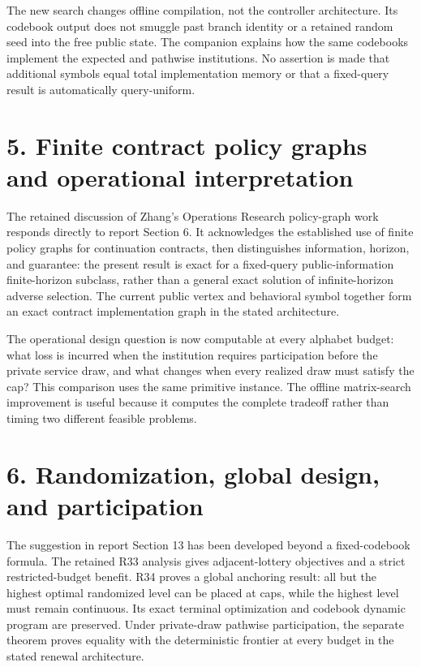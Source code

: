 \documentclass[11pt,letterpaper]{article}
\begin{document}
The new search changes offline compilation, not the controller architecture. Its codebook output does not smuggle past branch identity or a retained random seed into the free public state. The companion explains how the same codebooks implement the expected and pathwise institutions. No assertion is made that additional symbols equal total implementation memory or that a fixed-query result is automatically query-uniform.


\section*{5. Finite contract policy graphs and operational interpretation}

The retained discussion of Zhang's Operations Research policy-graph work responds directly to report Section 6. It acknowledges the established use of finite policy graphs for continuation contracts, then distinguishes information, horizon, and guarantee: the present result is exact for a fixed-query public-information finite-horizon subclass, rather than a general exact solution of infinite-horizon adverse selection. The current public vertex and behavioral symbol together form an exact contract implementation graph in the stated architecture.


The operational design question is now computable at every alphabet budget: what loss is incurred when the institution requires participation before the private service draw, and what changes when every realized draw must satisfy the cap? This comparison uses the same primitive instance. The offline matrix-search improvement is useful because it computes the complete tradeoff rather than timing two different feasible problems.


\section*{6. Randomization, global design, and participation}

The suggestion in report Section 13 has been developed beyond a fixed-codebook formula. The retained R33 analysis gives adjacent-lottery objectives and a strict restricted-budget benefit. R34 proves a global anchoring result: all but the highest optimal randomized level can be placed at caps, while the highest level must remain continuous. Its exact terminal optimization and codebook dynamic program are preserved. Under private-draw pathwise participation, the separate theorem proves equality with the deterministic frontier at every budget in the stated renewal architecture.
\end{document}
